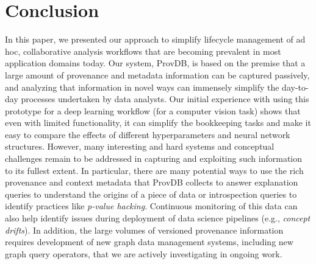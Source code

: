 \documentclass[11pt]{article}
\newcommand{\provdb}{{\sc ProvDB}\xspace}
\begin{document}
\section{Conclusion}
In this paper, we presented our approach to simplify lifecycle management of ad hoc, collaborative analysis workflows that are becoming prevalent in most application
domains today. Our system, \provdb, is based on the premise that a large amount of provenance and metadata information can be captured passively, and analyzing that
information in novel ways can immensely simplify the day-to-day processes undertaken by data analysts. Our initial experience with using this prototype for a deep
learning workflow (for a computer vision task) shows that even with limited functionality, it can simplify the bookkeeping tasks and make it easy to compare the effects
of different hyperparameters and neural network structures. However, many interesting and hard systems and conceptual challenges remain to be addressed in capturing and
exploiting such information to its fullest extent. In particular, there are many potential ways to use the rich provenance and context metadata that \provdb collects to
answer explanation queries to understand the origins of a piece of data or introspection queries to identify practices like {\em p-value hacking}. Continuous monitoring
of this data can also help identify issues during deployment of data science pipelines (e.g., {\em concept drifts}). In addition, the large volumes of versioned
provenance information requires development of new graph data management systems, including new graph query operators, that we are actively investigating in ongoing
work.
\end{document}
